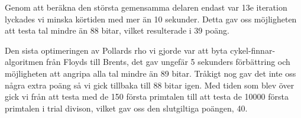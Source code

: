 \documentclass[a4paper,12pt]{article}
\renewcommand{\*}{\ensuremath{\cdot}}
\begin{document}
Genom att beräkna den största gemensamma delaren endast var 13e iteration lyckades vi minska körtiden med mer än 10 sekunder. Detta gav oss möjligheten att testa tal mindre än 88 bitar, vilket resulterade i 39 poäng.

Den sista optimeringen av Pollards rho vi gjorde var att byta cykel-finnar-algoritmen från Floyds till Brents, det gav ungefär 5 sekunders förbättring och möjligheten att angripa alla tal mindre än 89 bitar. Tråkigt nog gav det inte oss några extra poäng så vi gick tillbaka till 88 bitar igen. Med tiden som blev över gick vi från att testa med de 150 första primtalen till att testa de 10000 första primtalen i trial divison, vilket gav oss den slutgiltiga poängen, 40.
\end{document}

